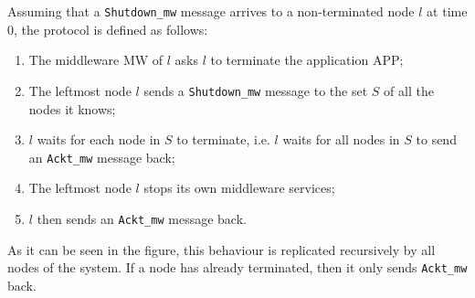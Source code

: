 
Assuming that a \texttt{Shutdown\_mw} message arrives to a non-terminated node
$l$ at time 0, the protocol is defined as follows:

\begin{enumerate}
  \item The middleware MW of $l$ asks $l$ to terminate the application APP;
  \item The leftmost node $l$ sends a \texttt{Shutdown\_mw} message to the set
    $S$ of all the nodes it knows;
  \item $l$ waits for each node in $S$ to terminate, i.e. $l$ waits for all
    nodes in $S$ to send an \texttt{Ackt\_mw} message back;
  \item The leftmost node $l$ stops its own middleware services;
  \item $l$ then sends an \texttt{Ackt\_mw} message back.
\end{enumerate}

As it can be seen in the figure, this behaviour is replicated recursively
by all nodes of the system. If a node has already terminated, then it only
sends \texttt{Ackt\_mw} back.
